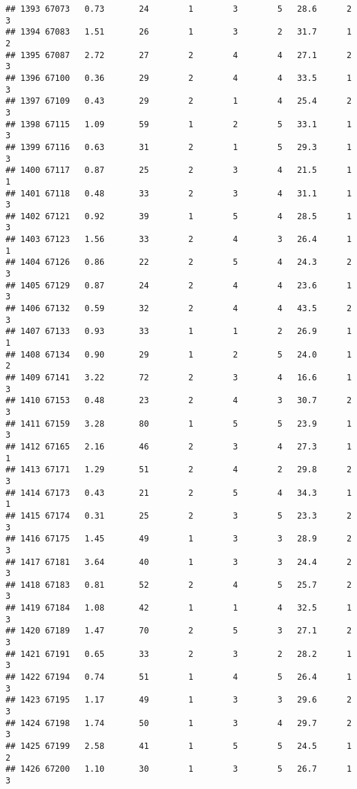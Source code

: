 \documentclass[
]{article}
\begin{document}
\begin{verbatim}
## 1393 67073   0.73       24        1        3        5   28.6      2      3
## 1394 67083   1.51       26        1        3        2   31.7      1      2
## 1395 67087   2.72       27        2        4        4   27.1      2      3
## 1396 67100   0.36       29        2        4        4   33.5      1      3
## 1397 67109   0.43       29        2        1        4   25.4      2      3
## 1398 67115   1.09       59        1        2        5   33.1      1      3
## 1399 67116   0.63       31        2        1        5   29.3      1      3
## 1400 67117   0.87       25        2        3        4   21.5      1      1
## 1401 67118   0.48       33        2        3        4   31.1      1      3
## 1402 67121   0.92       39        1        5        4   28.5      1      3
## 1403 67123   1.56       33        2        4        3   26.4      1      1
## 1404 67126   0.86       22        2        5        4   24.3      2      3
## 1405 67129   0.87       24        2        4        4   23.6      1      3
## 1406 67132   0.59       32        2        4        4   43.5      2      3
## 1407 67133   0.93       33        1        1        2   26.9      1      1
## 1408 67134   0.90       29        1        2        5   24.0      1      2
## 1409 67141   3.22       72        2        3        4   16.6      1      3
## 1410 67153   0.48       23        2        4        3   30.7      2      3
## 1411 67159   3.28       80        1        5        5   23.9      1      3
## 1412 67165   2.16       46        2        3        4   27.3      1      1
## 1413 67171   1.29       51        2        4        2   29.8      2      3
## 1414 67173   0.43       21        2        5        4   34.3      1      1
## 1415 67174   0.31       25        2        3        5   23.3      2      3
## 1416 67175   1.45       49        1        3        3   28.9      2      3
## 1417 67181   3.64       40        1        3        3   24.4      2      3
## 1418 67183   0.81       52        2        4        5   25.7      2      3
## 1419 67184   1.08       42        1        1        4   32.5      1      3
## 1420 67189   1.47       70        2        5        3   27.1      2      3
## 1421 67191   0.65       33        2        3        2   28.2      1      3
## 1422 67194   0.74       51        1        4        5   26.4      1      3
## 1423 67195   1.17       49        1        3        3   29.6      2      3
## 1424 67198   1.74       50        1        3        4   29.7      2      3
## 1425 67199   2.58       41        1        5        5   24.5      1      2
## 1426 67200   1.10       30        1        3        5   26.7      1      3

\end{verbatim}
\end{document}
